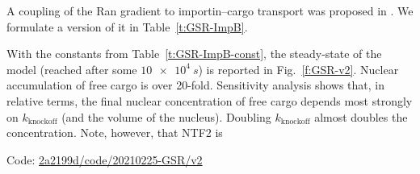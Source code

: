\documentclass[12pt,notitlepage]{article}
\begin{document}
A coupling of the Ran gradient
to 
importin--cargo transport
was proposed in 
\cite[Fig.~6A]{GoerlichSeewaldRibbeck2003}.
%
We formulate a version of it in 
Table~\ref{t:GSR-ImpB}.

%

With the constants from Table~\ref{t:GSR-ImpB-const},
the steady-state of the model
(reached after some $\SI{10e4}{s}$)
is reported in Fig.~\ref{f:GSR-v2}.
%
Nuclear
accumulation of free cargo
is over 20-fold.
%
%
Sensitivity analysis shows
that, in relative terms,
the final nuclear concentration of free cargo
depends 
most strongly
on
$k_\text{knockoff}$
(and the volume of the nucleus).
%
Doubling $k_\text{knockoff}$ almost doubles the concentration.
%
%
Note, however, that NTF2 is 


Code:
\href{https://github.com/numpde/nct1/tree/2a2199d/code/20210225-GSR/v2}{2a2199d/code/20210225-GSR/v2}


%

\end{document}
